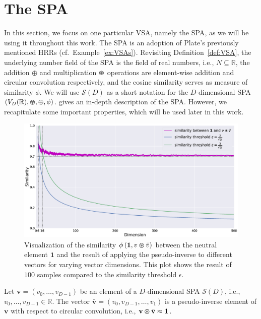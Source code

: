 \section{The \acl{SPA}}
\label{sec:spa}

In this section, we focus on one particular \ac{VSA}, namely the \ac{SPA}, as we will be using it throughout this work.
The \ac{SPA} is an adoption of Plate's previously mentioned \acp{HRR} (cf.\ Example~\ref{ex:VSAs}).
Revisiting Definition~\ref{def:VSA}, the underlying number field of the \ac{SPA} is the field of real numbers, i.e., $N \subseteq \mathbb{R}$, the addition $\oplus$ and multiplication $\varoast$ operations are element-wise addition and circular convolution respectively, and the cosine similarity serves as measure of similarity $\phi$.
We will use $\mathcal{S}(D)$ as a short notation for the $D$-dimensional \ac{SPA} $(V_{D}(\mathbb{R}), \varoast, \oplus, \phi)$.
\textcite{Eliasmith2013} gives an in-depth description of the \ac{SPA}.
However, we recapitulate some important properties, which will be used later in this work.
\begin{figure}[t!]
	\centering
	\includegraphics[width=1.0\textwidth]{imgs/pseudo_inverse_tsplot.eps}
	\caption{Visualization of the similarity $\phi\left(\mathbf{1}, v \varoast \bar{v}\right)$ between the neutral element $\mathbf{1}$ and the result of applying the pseudo-inverse to different vectors for varying vector dimensions. This plot shows the result of $100$ samples compared to the similarity threshold $\epsilon$.}
	\label{fig:pseudo_inv}
\end{figure}
\begin{lemma}
	\label{lemma:spa_pseudo_inv}
	Let $ \mathbf{v}=\left(v_0, \ldots, v_{D-1}\right)$ be an element of a $D$-dimensional \ac{SPA} $\mathcal{S}(D)$, i.e., $v_0, \ldots, v_{D-1} \in \mathbb{R}$.
	The vector $\bar{\mathbf{v}}=\left(v_0, v_{D-1}, \ldots, v_{1}\right)$ is a pseudo-inverse element of $ \mathbf{v}$ with respect to circular convolution, i.e., $ \mathbf{v} \varoast \bar{\mathbf{v}} \approx \mathbf{1}$.
\end{lemma}

